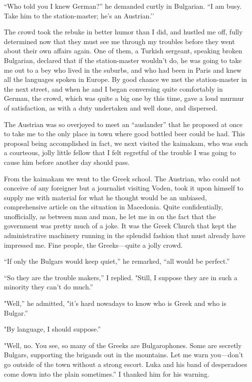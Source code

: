 \documentclass[a5paper,12pt]{book}
\begin{document}
“Who told you I knew German?” he demanded curtly in Bulgarian. “I am busy. Take him to the station-master; he’s an Austrian.’’ 

The crowd took the rebuke in better humor than I did, and hustled me off, fully determined now that they must see me through my troubles before they went about their own affairs again. One of them, a Turkish sergeant, speaking broken Bulgarian, declared that if the station-master wouldn’t do, he was going to take me out to a bey who lived in the suburbs, and who had been in Paris and knew all the languages spoken in Europe. By good chance we met the station-master in the next street, and when he and I began conversing quite comfortably in German, the crowd, which was quite a big one by this time, gave a loud murmur of satisfaction, as with a duty undertaken and well done, and dispersed. 

The Austrian was so overjoyed to meet an “auslander” that he proposed at once to take me to the only place in town where good bottled beer could be had. This proposal being accomplished in fact, we next visited the kaimakam, who was such a courteous, jolly little fellow that I felt regretful of the trouble I was going to cause him before another day should pass. 

From the kaimakam we went to the Greek school. The Austrian, who could not conceive of any foreigner but a journalist visiting Voden, took it upon himself to supply me with material for what he thought would be an unbiased, comprehensive article on the situation in Macedonia. Quite confidentially, unofficially, as between man and man, he let me in on the fact that the government was pretty much of a joke. It was the Greek Church that kept the administrative machinery running in the splendid fashion that must already have impressed me. Fine people, the Greeks—quite a jolly crowd. 

“If only the Bulgars would keep quiet,” he remarked, “all would be perfect.” 

“So they are the trouble makers,” I replied. "Still, I suppose they are in such a minority they can’t do much.” 

"Well,” he admitted, "it’s hard nowadays to know who is Greek and who is Bulgar.” 

"By language, I should suppose.” 

"Well, no. You see, so many of the Greeks are Bulgarophones. Some are secretly Bulgars, supporting the brigands out in the mountains. Let me warn you—don’t go outside of the town without a strong escort. Luka and his band of desperadoes come down into the plain sometimes.” I thanked him for his warning. 
\end{document}
